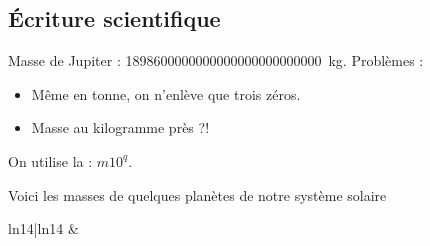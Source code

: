 \documentclass[french,xcolor=svgnames]{beamer}
\begin{document}
\subsection{Écriture scientifique}
\begin{frame}
  \begin{example}Masse de Jupiter : \SI{1898600000000000000000000000}{\kg}. Problèmes :
    \begin{itemize}
    \item Même en tonne, on n'enlève que trois zéros.\pause
    \item Masse au kilogramme près ?!
    \end{itemize}
  \end{example}\pause

\begin{answer}
  On utilise la  : \(m 10^{q}\).
\end{answer}\pause

\begin{example}
  Voici les masses de quelques planètes de notre système solaire
  \begin{center}\pause
    \begin{tabular}{ln{1}{4}|ln{1}{4}}
       &   %
      \\ \toprule
    \end{tabular}
  \end{center}
\end{example}
\end{frame}
\end{document}
